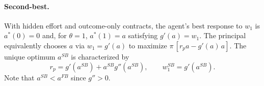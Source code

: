 \documentclass[11pt]{article}
\begin{document}
\paragraph{Second-best.} With hidden effort and outcome-only contracts, the agent's best response to $w_1$ is $a^*(0)=0$ and, for $\theta=1$, $a^*(1)=a$ satisfying $g'(a)=w_1$. The principal equivalently chooses $a$ via $w_1=g'(a)$ to maximize $\pi\,[r_p a-g'(a)\,a]$. The unique optimum $a^{SB}$ is characterized by
\[
r_p = g'(a^{SB}) + a^{SB} g''(a^{SB}),\qquad w_1^{SB}=g'(a^{SB}).
\]
Note that $a^{SB} < a^{FB}$ since $g''>0$.
\end{document}
